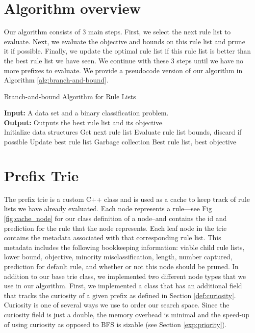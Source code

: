 \section{Algorithm overview}
Our algorithm consists of 3 main steps.
First, we select the next rule list to evaluate.
Next, we evaluate the objective and bounds on this rule list and prune it if possible.
Finally, we update the optimal rule list if this rule list is better than the best rule list we have seen.
We continue with these 3 steps until we have no more prefixes to evaluate.
We provide a pseudocode version of our algorithm in Algorithm \ref{alg:branch-and-bound}.

\begin{algorithm}[t!]
  \caption{Branch-and-bound Algorithm for Rule Lists}
\label{alg:branch-and-bound}
\begin{algorithmic}
\normalsize
\State \textbf{Input:} A data set and a binary classification problem.\\
\State \textbf{Output:} Outputs the best rule list and its objective\\
\State Initialize data structures
	\State Get next rule list
	\State Evaluate rule list bounds, discard if possible
		\State Update best rule list
		\State Garbage collection
	\EndIf
\EndWhile
\State \Return Best rule list, best objective
\end{algorithmic}
\end{algorithm}

\section{Prefix Trie}
The prefix trie is a custom C++ class and is used as a cache to keep track of rule lists we have already evaluated. 
Each node represents a rule---see Fig \ref{fig:cache_node} for our class definition of a node--and contains the id and prediction for the rule that the node represents.
Each leaf node in the trie contains the metadata associated with that corresponding rule list. 
This metadata includes the following bookkeeping information: viable child rule lists, lower bound, objective, minority misclassification, length, number captured, prediction for default rule, and whether or not this node should be pruned.
In addition to our base trie class, we implemented two different node types that we use in our algorithm.
First, we implemented a class that has an additional field that tracks the curiosity of a given prefix as defined in Section \ref{def:curiosity}.
Curiosity is one of several ways we use to order our search space.
Since the curiosity field is just a double, the memory overhead is minimal and the speed-up of using curiosity as opposed to BFS is sizable (see Section \ref{exp:priority}).

